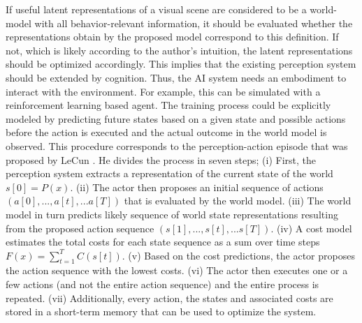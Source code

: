 If useful latent representations of a visual scene are considered to be a world-model with all behavior-relevant information, it should be evaluated whether the representations obtain by the proposed model correspond to this definition.
If not, which is likely according to the author's intuition, the latent representations should be optimized accordingly.
This implies that the existing perception system should be extended by cognition.
Thus, the AI system needs an embodiment to interact with the environment.
For example, this can be simulated with a reinforcement learning based agent.
The training process could be explicitly modeled by predicting future states based on a given state and possible actions before the action is executed and the actual outcome in the world model is observed.
This procedure corresponds to the perception-action episode that was proposed by LeCun .
He divides the process in seven steps;
(i) First, the perception system extracts a representation of the current state of the world \(s[0]=P(x)\). (ii) The actor then proposes an initial sequence of actions \((a[0], ..., a[t], ... a[T])\) that is evaluated by the world model. (iii) The world model in turn predicts likely sequence of world state representations resulting from the proposed action sequence \((s[1], ..., s[t], ... s[T])\). (iv) A cost model estimates the total costs for each state sequence as a sum over time steps \(F(x)=\sum_{t=1}^{T}C(s[t])\). (v) Based on the cost predictions, the actor proposes the action sequence with the lowest costs. (vi) The actor then executes one or a few actions (and not the entire action sequence) and the entire process is repeated. (vii) Additionally, every action, the states and associated costs are stored in a short-term memory that can be used to optimize the system.




